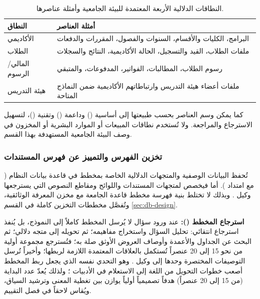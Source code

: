 \begin{table}[H]
\centering
\caption{النطاقات الدلالية الأربعة المعتمدة للبيئة الجامعية وأمثلة عناصرها.}
\label{tab:sv-domains}
\scriptsize
\renewcommand{\arraystretch}{1.35}
\begin{tabularx}{\textwidth}{|>{\raggedright\arraybackslash}p{3.0cm}|>{\raggedright\arraybackslash}X|}
\hline
\textbf{النطاق} & \textbf{أمثلة العناصر} \\
\hline
الأكاديمي & البرامج، الكليات والأقسام، السنوات والفصول، المقررات والدفعات \\
\hline
الطلاب & ملفات الطلاب، القيد والتسجيل، الحالة الأكاديمية، النتائج والسجلات \\
\hline
المالي/الرسوم & رسوم الطلاب، المطالبات، الفواتير، المدفوعات، والمتبقي \\
\hline
هيئة التدريس & ملفات أعضاء هيئة التدريس وارتباطاتهم الأكاديمية ضمن النماذج المتاحة \\
\hline
\end{tabularx}
\end{table}

كما يمكن وسم العناصر بحسب طبيعتها إلى أساسية () وداعمة () وتقنية ()، لتسهيل الاسترجاع والمراجعة. ولا تُستخدم نطاقات المبيعات أو الموارد البشرية أو المخزون في وصف البيئة الجامعية المستهدفة بهذا القسم.

\subsubsection{تخزين الفهرس والتمييز عن فهرس المستندات}

تُحفظ البيانات الوصفية والمتجهات الدلالية الخاصة بمخطط  في قاعدة بيانات النظام ( مع امتداد ). أما  فيخصص لمتجهات المستندات واللوائح ومقاطع النصوص التي يسترجعها وكيل . وبذلك لا تختلط بنية فهرسة مخطط قاعدة الجامعة مع مخزن المعرفة الوثائقية، وتُفصَّل مخططات التخزين كاملة في القسم \ref{sec:db-design}.

\textbf{استرجاع المخطط ():} عند ورود سؤال لا يُرسل المخطط كاملاً إلى النموذج، بل يُنفذ استرجاع انتقائي: تحليل السؤال واستخراج مفاهيمه؛ ثم تحويله إلى متجه دلالي؛ ثم البحث عن الجداول والأعمدة وأوصاف العروض الأوثق صلة به؛ فتُسترجع مجموعة أولية من نحو 15 إلى 20 عنصراً تُستكمل بالعلاقات المعتمدة اللازمة لربطها؛ وأخيراً تُرسل التوصيفات المختصرة وحدها إلى وكيل . وهو التحدي نفسه الذي يجعل ربط المخطط أصعب خطوات التحويل من اللغة إلى الاستعلام في الأدبيات \cite{yu2018spider}؛ ولذلك يُعدّ عدد البداية (من 15 إلى 20 عنصراً) هدفاً تصميمياً أولياً يوازن بين تغطية المعنى وترشيد السياق، ويُقاس لاحقاً في فصل التقييم.

